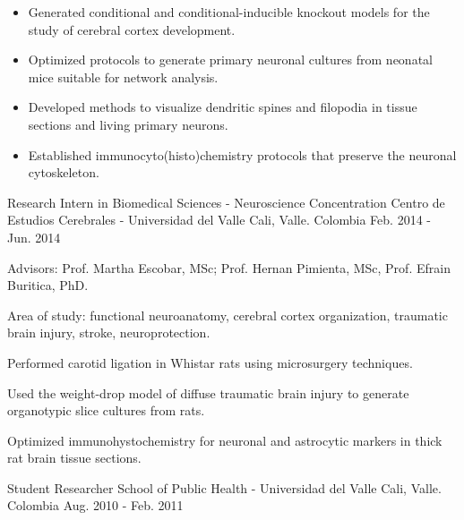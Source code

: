 \begin{cventries}
{\begin{cvitems}
        \begin{itemize}
          \begin{itemize}
            \item {Generated conditional and conditional-inducible knockout models for the study of cerebral cortex development.}
            \item {Optimized protocols to generate primary neuronal cultures from neonatal mice suitable for network analysis.}
            \item {Developed methods to visualize dendritic spines and filopodia in tissue sections and living primary neurons.}
            \item {Established immunocyto(histo)chemistry protocols that preserve the neuronal cytoskeleton.}
            \end{itemize}
        \end{itemize}
      \end{cvitems}
      }
  \cventry
    {Research Intern in Biomedical Sciences - Neuroscience Concentration} %
    {Centro de Estudios Cerebrales - Universidad del Valle} %
    {Cali, Valle. Colombia} %
    {Feb. 2014 - Jun. 2014} %
    {
      \begin{cvitems} %
        \item {Advisors: Prof. Martha Escobar, MSc; Prof. Hernan Pimienta, MSc, Prof. Efrain Buritica, PhD.}
        \item {Area of study: functional neuroanatomy, cerebral cortex organization, traumatic brain injury, stroke, neuroprotection.}
        \item {Performed carotid ligation in Whistar rats using microsurgery techniques.}
        \item {Used the weight-drop model of diffuse traumatic brain injury to generate organotypic slice cultures from rats.}
        \item {Optimized immunohystochemistry for neuronal and astrocytic markers in thick rat brain tissue sections.}
      \end{cvitems}
    }
\vspace{10pt}
  \cventry
  {Student Researcher} %
  {School of Public Health - Universidad del Valle} %
  {Cali, Valle. Colombia} %
  {Aug. 2010 - Feb. 2011} %
  {
  \begin{cvitems} %

\end{cvitems}}
\end{cventries}
